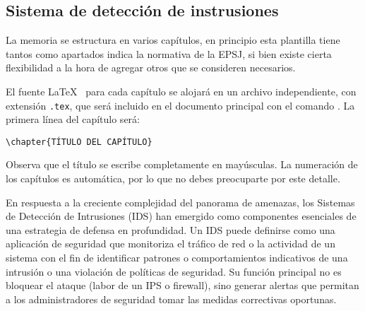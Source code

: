 \subsection{Sistema de detección de instrusiones}\label{Sec.Capitulos}
La memoria se estructura en varios capítulos, en principio esta plantilla tiene tantos como apartados indica la normativa de la EPSJ, si bien existe cierta flexibilidad a la hora de agregar otros que se consideren necesarios.

El fuente \LaTeX~ para cada capítulo se alojará en un archivo independiente, con extensión \texttt{.tex}, que será incluido en el documento principal con el comando \verb*||. La primera línea del capítulo será:

\begin{verbatim}
\chapter{TÍTULO DEL CAPÍTULO}
\end{verbatim}

Observa que el título se escribe completamente en mayúsculas. La numeración de los capítulos es automática, por lo que no debes preocuparte por este detalle.

En respuesta a la creciente complejidad del panorama de amenazas, los Sistemas de Detección de Intrusiones (IDS) han emergido como componentes esenciales de una estrategia de defensa en profundidad. Un IDS puede definirse como una aplicación de seguridad que monitoriza el tráfico de red o la actividad de un sistema con el fin de identificar patrones o comportamientos indicativos de una intrusión o una violación de políticas de seguridad. Su función principal no es bloquear el ataque (labor de un IPS o firewall), sino generar alertas que permitan a los administradores de seguridad tomar las medidas correctivas oportunas.

